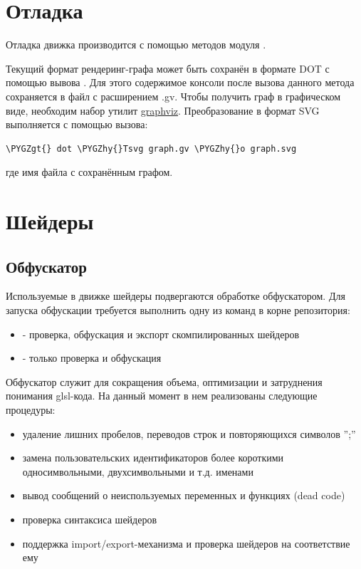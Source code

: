 \documentclass[a4paper,12pt,oneside]{sphinxmanual}
\def\PYGZgt{\char`\>}
\def\PYGZhy{\char`\-}
\begin{document}
\section{Отладка}
\label{developers:id11}
Отладка движка производится с помощью методов модуля .

Текущий формат рендеринг-графа может быть сохранён в формате DOT с помощью
вывова . Для этого содержимое консоли после
вызова данного метода сохраняется в файл с расширением .gv. Чтобы получить граф
в графическом виде, необходим набор утилит \href{http://www.graphviz.org/}{graphviz}.
Преобразование в формат SVG выполняется с помощью вызова:

\begin{Verbatim}[commandchars=\\\{\}]
\PYGZgt{} dot \PYGZhy{}Tsvg graph.gv \PYGZhy{}o graph.svg
\end{Verbatim}

где  имя файла с сохранённым графом.


\section{Шейдеры}
\label{developers:id12}\label{developers:shaders}

\subsection{Обфускатор}
\label{developers:id13}\label{developers:index-0}
Используемые в движке шейдеры подвергаются обработке обфускатором.
Для запуска обфускации требуется выполнить одну из команд в корне репозитория:
\begin{itemize}
\item {} 
 - проверка, обфускация и экспорт скомпилированных шейдеров

\item {} 
 - только проверка и обфускация

\end{itemize}

Обфускатор служит для сокращения объема, оптимизации и затруднения понимания
glsl-кода. На данный момент в нем реализованы следующие процедуры:
\begin{itemize}
\item {} 
удаление лишних пробелов, переводов строк и повторяющихся символов '';''

\item {} 
замена пользовательских идентификаторов более короткими односимвольными, двухсимвольными и т.д. именами

\item {} 
вывод сообщений о неиспользуемых переменных и функциях (dead code)

\item {} 
проверка синтаксиса шейдеров

\item {} 
поддержка import/export-механизма и проверка шейдеров на соответствие ему

\end{itemize}
\end{document}
